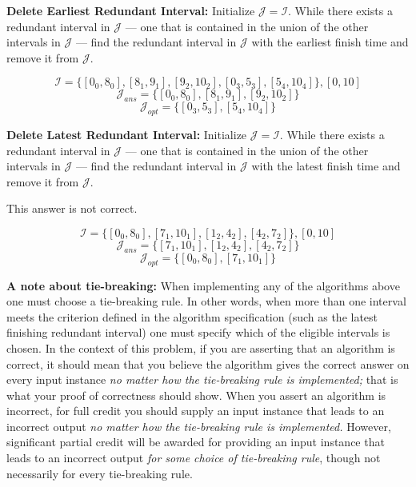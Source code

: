 \documentclass{hw}
\begin{document}
\begin{problem}
  \begin{subproblem}
    \textbf{Delete Earliest Redundant Interval:}
  Initialize $\mathcal{J}=\mathcal{I}$. While there
  exists a redundant interval in $\mathcal{J}$ --- one
  that is contained in the union of the other intervals
  in $\mathcal{J}$ --- find the redundant interval in
  $\mathcal{J}$ with the earliest finish time and
  remove it from $\mathcal{J}$.
\end{subproblem}

\begin{solution}
$$
\mathcal{I} = \{[0_0,8_0], [8_1,9_1], [9_2,10_2], [0_3,5_3], [5_4,10_4]\}, [0,10]
$$
$$
\mathcal{J}_{ans} = \{[0_0,8_0], [8_1,9_1], [9_2,10_2]\}
$$
$$
\mathcal{J}_{opt} = \{[0_3,5_3], [5_4,10_4]\}
$$
\end{solution}
    
\begin{subproblem}
    \textbf{Delete Latest Redundant Interval:}
  Initialize $\mathcal{J}=\mathcal{I}$. While there
  exists a redundant interval in $\mathcal{J}$ --- one
  that is contained in the union of the other intervals
  in $\mathcal{J}$ --- find the redundant interval in
  $\mathcal{J}$ with the latest finish time and remove it
  from $\mathcal{J}$.
\end{subproblem}

\begin{solution}
This answer is not correct.

$$
\mathcal{I} = \{[0_0,8_0],[7_1,10_1],[1_2,4_2],[4_2,7_2]\}, [0,10]
$$
$$
\mathcal{J}_{ans} = \{[7_1,10_1],[1_2,4_2],[4_2,7_2]\}
$$
$$
\mathcal{J}_{opt} = \{[0_0,8_0],[7_1,10_1]\}
$$
\end{solution}

{\bf A note about tie-breaking:}
When implementing any of the algorithms above one must
choose a tie-breaking rule. In other words, when more than
one interval meets the criterion defined in the algorithm
specification (such as the latest finishing redundant
interval) one must specify which of the eligible
intervals is chosen. In the context of this problem,
if you are asserting that an algorithm is correct,
it should mean that you believe the algorithm gives
the correct answer on every input instance
{\em no matter how the tie-breaking rule is implemented;}
that is what your proof of correctness should show.
When you assert an algorithm is incorrect,
for full credit you should supply an input instance
that leads to an incorrect output {\em no matter how
the tie-breaking rule is implemented.} However,
significant partial credit will be awarded for
providing an input instance that leads to an incorrect
output {\em for some choice of tie-breaking rule},
though not necessarily for every tie-breaking rule.

\end{problem}
\newpage
\end{document}

